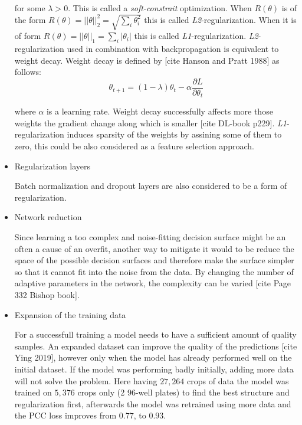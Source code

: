 \begin{itemize}
	for some $\lambda > 0$. This is called a \emph{soft-constrait} optimization. When $R(\theta)$ is of the form $R(\theta) = ||\theta||^2_2 = \sqrt{\sum\limits_i \theta_i^2}$ this is called \emph{L2}-regularization. When it is of form $R(\theta) = ||\theta||_1 = \sum\limits_i |\theta_i|$ this is called \emph{L1}-regularization. \emph{L2}-regularization used in combination with backpropagation is equivalent to weight decay. Weight decay is defined by [cite Hanson and Pratt 1988] as follows:
	\begin{equation}
		\theta_{t+1} = (1 - \lambda)\theta_t - \alpha \frac{\partial L}{\partial \theta_t}
	\end{equation}

	where $\alpha$ is a learning rate. Weight decay successfully affects more those weights the gradient change along which is smaller [cite DL-book p229]. \emph{L1}-regularization induces sparsity of the weights by assining some of them to zero, this could be also considered as a feature selection approach.

	\item Regularization layers

	Batch normalization and dropout layers are also considered to be a form of regularization. 

	\item Network reduction
	
	Since learning a too complex and noise-fitting decision surface might be an often a cause of an overfit, another way to mitigate it would to be reduce the space of the possible decision surfaces and therefore make the surface simpler so that it cannot fit into the noise from the data. By changing the number of adaptive parameters in the network, the complexity can be varied [cite Page 332 Bishop book].

	\item Expansion of the training data

	For a successfull training a model needs to have a sufficient amount of quality samples. An expanded dataset can improve the quality of the predictions [cite Ying 2019], however only when the model has already performed well on the initial dataset. If the model was performing badly initially, adding more data will not solve the problem. Here having $27,264$ crops of data the model was trained on $5,376$ crops only (2 96-well plates) to find the best structure and regularization first, afterwards the model was retrained using more data and the PCC loss improves from $0.77$, to $0.93$.
\end{itemize}
